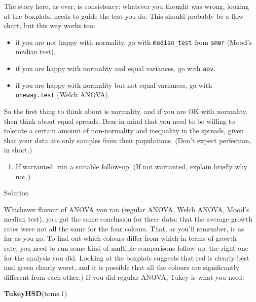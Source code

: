 \documentclass[]{tufte-book}
\newenvironment{Shaded}{}{}
\newcommand{\FloatTok}[1]{\textcolor[rgb]{0.25,0.63,0.44}{#1}}
\newcommand{\KeywordTok}[1]{\textcolor[rgb]{0.00,0.44,0.13}{\textbf{#1}}}
\newcommand{\NormalTok}[1]{#1}
\providecommand{\tightlist}{%
  \setlength{\itemsep}{0pt}\setlength{\parskip}{0pt}}
\theoremstyle{definition}
\theoremstyle{definition}
\theoremstyle{definition}
\theoremstyle{remark}
\begin{document}
The story here, as ever, is consistency: whatever you thought was wrong,
looking at the boxplots, needs to guide the test you do. This should
probably be a flow chart, but this way works too:

\begin{itemize}
\item
  if you are not happy with normality, go with \texttt{median\_test}
  from \texttt{smmr} (Mood's median test).
\item
  if you are happy with normality and equal variances, go with
  \texttt{aov}.
\item
  if you are happy with normality but not equal variances, go with
  \texttt{oneway.test} (Welch ANOVA).
\end{itemize}

So the first thing to think about is normality, and if you are OK with
normality, then think about equal spreads. Bear in mind that you need to
be willing to tolerate a certain amount of non-normality and inequality
in the spreads, given that your data are only samples from their
populations. (Don't expect perfection, in short.)

\begin{enumerate}
\def\labelenumi{(\alph{enumi})}
\setcounter{enumi}{5}
\tightlist
\item
  If warranted, run a suitable follow-up. (If not warranted, explain
  briefly why not.)
\end{enumerate}

Solution

Whichever flavour of ANOVA you ran (regular ANOVA, Welch ANOVA, Mood's
median test), you got the same conclusion for these data: that the
average growth rates were not all the same for the four colours. That,
as you'll remember, is as far as you go. To find out which colours
differ from which in terms of growth rate, you need to run some kind of
multiple-comparisons follow-up, the right one for the analysis you did.
Looking at the boxplots suggests that red is clearly best and green
clearly worst, and it is possible that all the colours are significantly
different from each other.) If you did regular ANOVA, Tukey is what you
need:

\begin{Shaded}
\begin{Highlighting}[]
\KeywordTok{TukeyHSD}\NormalTok{(toms}\FloatTok{.1}\NormalTok{)}
\end{Highlighting}
\end{Shaded}
\end{document}
